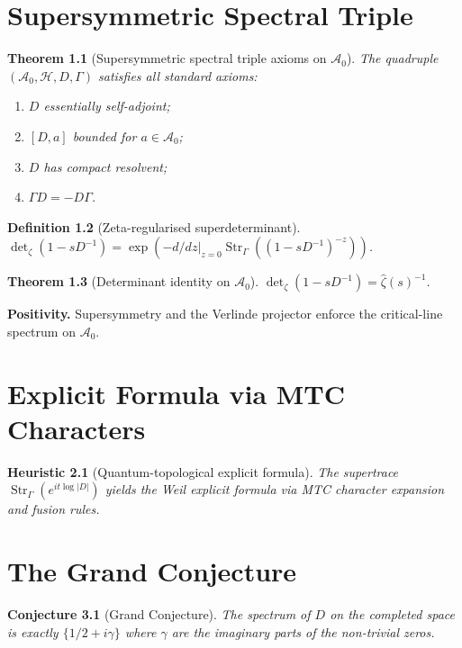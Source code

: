 \documentclass[11pt, oneside]{book}
\newtheorem{theorem}{Theorem}[chapter]
\newtheorem{definition}[theorem]{Definition}
\newtheorem{conjecture}[theorem]{Conjecture}
\newtheorem{heuristic}[theorem]{Heuristic}
\begin{document}
\chapter{Supersymmetric Spectral Triple}
\label{ch:susy-triple}

\begin{theorem}[Supersymmetric spectral triple axioms on \(\mathcal{A}_0\)]
The quadruple \((\mathcal{A}_0, \mathcal{H}, D, \Gamma)\) satisfies all standard axioms:
\begin{enumerate}
\item \(D\) essentially self-adjoint;
\item \([D,a]\) bounded for \(a\in\mathcal{A}_0\);
\item \(D\) has compact resolvent;
\item \(\Gamma D = -D\Gamma\).
\end{enumerate}
\end{theorem}

\begin{definition}[Zeta-regularised superdeterminant]
\(\det_\zeta(1-sD^{-1}) = \exp(-d/dz|_{z=0} \operatorname{Str}_\Gamma((1-sD^{-1})^{-z}))\).
\end{definition}

\begin{theorem}[Determinant identity on \(\mathcal{A}_0\)]
\(\det_\zeta(1-sD^{-1}) = \hat{\zeta}(s)^{-1}\).
\end{theorem}

\textbf{Positivity.} Supersymmetry and the Verlinde projector enforce the critical-line spectrum on \(\mathcal{A}_0\).

\chapter{Explicit Formula via MTC Characters}
\label{ch:explicit-formula}

\begin{heuristic}[Quantum-topological explicit formula]
The supertrace \(\operatorname{Str}_\Gamma(e^{it\log|D|})\) yields the Weil explicit formula via MTC character expansion and fusion rules.
\end{heuristic}

\chapter{The Grand Conjecture}
\label{ch:grand-conjecture}

\begin{conjecture}[Grand Conjecture]
The spectrum of \(D\) on the completed space is exactly \(\{1/2 + i\gamma\}\) where \(\gamma\) are the imaginary parts of the non-trivial zeros.
\end{conjecture}
\end{document}
